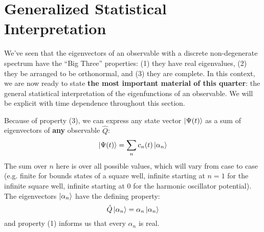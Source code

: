\documentclass[12pt]{book}
\begin{document}
\section{Generalized Statistical Interpretation}

We've seen that the eigenvectors of an observable with a discrete non-degenerate spectrum have the ``Big Three'' properties:  (1) they have real eigenvalues, (2) they be arranged to be orthonormal, and (3) they are complete.  In this context, we are now ready to state {\bf the most important material of this quarter}:  the general statistical interpretation of the eigenfunctions of an observable.  We will be explicit with time dependence throughout this section.

Because of property (3), we can express any state vector $\ket{\Psi(t)}$ as a sum of eigenvectors of {\bf any} observable $\hat{Q}$:
\begin{equation}
\label{eqn:sumeigen}
\ket{\Psi(t)} = \sum_n c_n(t) \ket{\alpha_n}
\end{equation}
The sum over $n$ here is over all possible values, which will vary from case to case (e.g. finite for bounds states of a square well, infinite starting at $n=1$ for the infinite square well, infinite starting at $0$ for the harmonic oscillator potential).  The eigenvectors $\ket{\alpha_n}$ have the defining property:
$$\hat{Q} \ket{\alpha_n} = \alpha_n \ket{\alpha_n}$$
and property (1) informs us that every $\alpha_n$ is real.  
\end{document}
